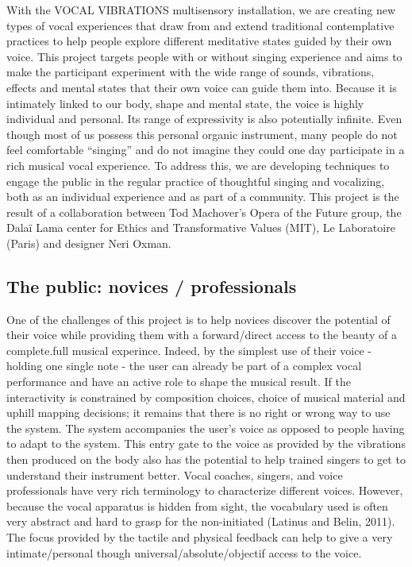 \documentclass{nime-alternate}
\begin{document}
With the VOCAL VIBRATIONS multisensory installation, we are creating new types of vocal experiences that draw from and extend traditional contemplative practices to help people explore different meditative states guided by their own voice. This project targets people with or without singing experience and aims to make the participant experiment with the wide range of sounds, vibrations, effects and mental states that their own voice can guide them into. Because it is intimately linked to our body, shape and mental state, the voice is highly individual and personal. Its range of expressivity is also potentially infinite. Even though most of us possess this personal organic instrument, many people do not feel comfortable “singing” and do not imagine they could one day participate in a rich musical vocal experience. To address this, we are developing techniques to engage the public in the regular practice of thoughtful singing and vocalizing, both as an individual experience and as part of a community. This project is the result of a collaboration between Tod Machover’s Opera of the Future group, the Dalaï Lama center for Ethics and Transformative Values (MIT), Le Laboratoire (Paris) and designer Neri Oxman.



\subsection{The public: novices / professionals}

One of the challenges of this project is to help novices discover the potential of their voice while providing them with a forward/direct access to the beauty of a complete.full musical experince. Indeed, by the simplest use of their voice - holding one single note - the user can already be part of a complex vocal performance and have an active role to shape the musical result. If the interactivity is constrained by composition choices, choice of musical material and uphill mapping decisions; it remains that there is no right or wrong way to use the system. The system accompanies the user’s voice as opposed to people having to adapt to the system. 
This entry gate to the voice as provided by the vibrations then produced on the body also has the potential to help trained singers to get to understand their instrument better. Vocal coaches, singers, and voice professionals have very rich terminology to characterize different voices. However, because the vocal apparatus is hidden from sight, the vocabulary used is often very abstract and hard to grasp for the non-initiated (Latinus and Belin, 2011). The focus provided by the tactile and physical feedback can help to give a very intimate/personal though universal/absolute/objectif access to the voice.
\end{document}
